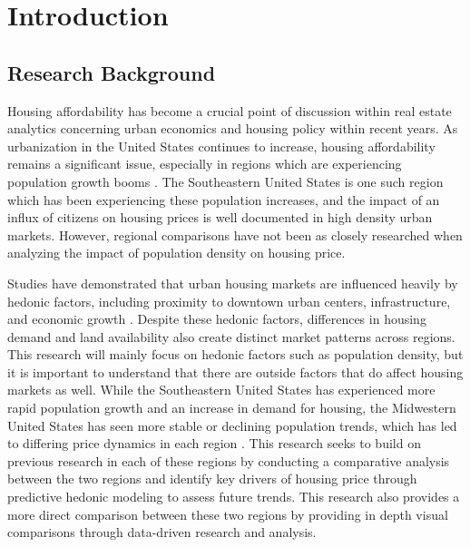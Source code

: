 \documentclass[journal,article,submit,pdftex,moreauthors]{Definitions/mdpi}
\begin{document}
\pagestyle{fancy}
\thispagestyle{empty} %
\flushbottom
\raggedbottom



\section{Introduction}

\subsection{Research Background}

Housing affordability has become a crucial point of discussion within real estate analytics concerning urban economics and housing policy within recent years. As urbanization in the United States continues to increase, housing affordability remains a significant issue, especially in regions which are experiencing population growth booms \citep{desilver2024}. The Southeastern United States is one such region which has been experiencing these population increases, and the impact of an influx of citizens on housing prices is well documented in high density urban markets. However, regional comparisons have not been as closely researched when analyzing the impact of population density on housing price.

Studies have demonstrated that urban housing markets are influenced heavily by hedonic factors, including proximity to downtown urban centers, infrastructure, and economic growth \citep{sirmans_2005_the}. Despite these hedonic factors, differences in housing demand and land availability also create distinct market patterns across regions. This research will mainly focus on hedonic factors such as population density, but it is important to understand that there are outside factors that do affect housing markets as well. While the Southeastern United States has experienced more rapid population growth and an increase in demand for housing, the Midwestern United States has seen more stable or declining population trends, which has led to differing price dynamics in each region \citep{souders_2016_the}. This research seeks to build on previous research in each of these regions by conducting a comparative analysis between the two regions and identify key drivers of housing price through predictive hedonic modeling to assess future trends. This research also provides a more direct comparison between these two regions by providing in depth visual comparisons through data-driven research and analysis.
\end{document}
